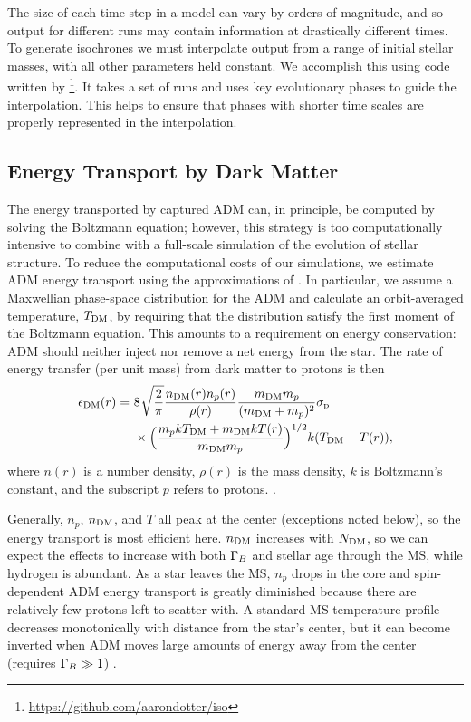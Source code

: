 \documentclass[useAMS,usenatbib]{mnras}
\begin{document}
  The size of each time step in a \mesa model can vary by orders of magnitude, and so output for different \mesa runs may contain information at drastically different times. To generate isochrones we must interpolate output from a range of initial stellar masses, with all other parameters held constant. We accomplish this using code written by \citet{Dotter2016MesaIsochrones}\footnote{\url{https://github.com/aarondotter/iso}}. It takes a set of \mesa runs and uses key evolutionary phases to guide the interpolation. This helps to ensure that phases with shorter time scales are properly represented in the interpolation.

\subsection{Energy Transport by Dark Matter}
\label{sub:energytransport}

  The energy transported by captured ADM can, in principle, be computed by solving the Boltzmann equation; however, this strategy is too computationally intensive to combine with a full-scale simulation of the evolution of stellar structure. To reduce the computational costs of our simulations, we estimate ADM energy transport using the approximations of \citet{Spergel1985EffectInterior}. In particular, we assume a Maxwellian phase-space distribution for the ADM and calculate an orbit-averaged temperature, $T_{\mathrm{DM}}$, by requiring that the distribution satisfy the first moment of the Boltzmann equation. This amounts to a requirement on energy conservation: ADM should neither inject nor remove a net energy from the star. The rate of energy transfer (per unit mass) from dark matter to protons is then
  \begin{align}
  \begin{split}
  \epsilon_{\mathrm{DM}}(r) =\ & 8\ \sqrt[]{\frac{2}{\pi}} \frac{n_{\mathrm{DM}}(r) n_p(r)}{\rho(r)} \frac{m_{\mathrm{DM}} m_p}{(m_{\mathrm{DM}}+m_p)^2} \sigma_{\mathrm{p}}\\
  & \times \Big(\frac{m_p k T_{\mathrm{DM}} + m_{\mathrm{DM}} k T(r)}{m_{\mathrm{DM}} m_p}\Big)^{1/2} k (T_{\mathrm{DM}} - T(r)),
  \label{eq:xheat}
  \end{split}
  \end{align}
  where $n(r)$ is a number density, $\rho(r)$ is the mass density, $k$ is Boltzmann's constant, and the subscript $p$ refers to protons. \citep[See][for a detailed calculation]{Spergel1985EffectInterior}.

  Generally, $n_p$, $n_{\mathrm{DM}}$, and $T$ all peak at the center (exceptions noted below), so the energy transport is most efficient here. $n_{\mathrm{DM}}$ increases with $N_{\mathrm{DM}}$, so we can expect the effects to increase with both $\Gamma_B$ and stellar age through the MS, while hydrogen is abundant. As a star leaves the MS, $n_p$ drops in the core and spin-dependent ADM energy transport is greatly diminished because there are relatively few protons left to scatter with. A standard MS temperature profile decreases monotonically with distance from the star's center, but it can become inverted when ADM moves large amounts of energy away from the center (requires $\Gamma_B \gg 1$) .
\end{document}

